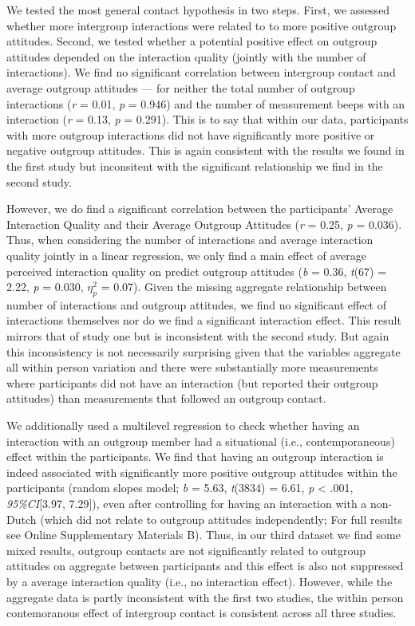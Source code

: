 \documentclass[man, 12pt, a4paper]{apa7}
\theoremstyle{break}
\theoremstyle{plain}
\begin{document}
We tested the most general contact hypothesis in two steps. First, we
assessed whether more intergroup interactions were related to to more
positive outgroup attitudes. Second, we tested whether a potential
positive effect on outgroup attitudes depended on the interaction
quality (jointly with the number of interactions). We find no
significant correlation between intergroup contact and average outgroup
attitudes --- for neither the total number of outgroup interactions
(\textit{r} = 0.01, \textit{p} = 0.946) and the number of measurement
beeps with an interaction (\textit{r} = 0.13, \textit{p} = 0.291). This
is to say that within our data, participants with more outgroup
interactions did not have significantly more positive or negative
outgroup attitudes. This is again consistent with the results we found
in the first study but inconsitent with the significant relationship we
find in the second study.

However, we do find a significant correlation between the participants'
Average Interaction Quality and their Average Outgroup Attitudes
(\textit{r} = 0.25, \textit{p} = 0.036). Thus, when considering the
number of interactions and average interaction quality jointly in a
linear regression, we only find a main effect of average perceived
interaction quality on predict outgroup attitudes (\textit{b} = 0.36,
\textit{t}(67) = 2.22, \textit{p} = 0.030, \(\eta_p^2\) = 0.07). Given
the missing aggregate relationship between number of interactions and
outgroup attitudes, we find no significant effect of interactions
themselves nor do we find a significant interaction effect. This result
mirrors that of study one but is inconsistent with the second study. But
again this inconsistency is not necessarily surprising given that the
variables aggregate all within person variation and there were
substantially more measurements where participants did not have an
interaction (but reported their outgroup attitudes) than measurements
that followed an outgroup contact.

We additionally used a multilevel regression to check whether having an
interaction with an outgroup member had a situational (i.e.,
contemporaneous) effect within the participants. We find that having an
outgroup interaction is indeed associated with significantly more
positive outgroup attitudes within the participants (random slopes
model; \textit{b} = 5.63, \textit{t}(3834) = 6.61, \textit{p}
\textless{} .001, \textit{95\%CI}{[}3.97, 7.29{]}), even after
controlling for having an interaction with a non-Dutch (which did not
relate to outgroup attitudes independently; For full results see Online
Supplementary Materials B). Thus, in our third dataset we find some
mixed results, outgroup contacts are not significantly related to
outgroup attitudes on aggregate between participants and this effect is
also not suppressed by a average interaction quality (i.e., no
interaction effect). However, while the aggregate data is partly
inconsistent with the first two studies, the within person contemoranous
effect of intergroup contact is consistent across all three studies.
\end{document}
